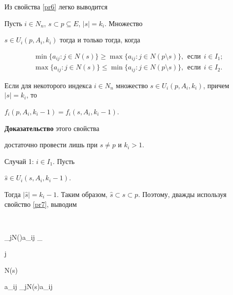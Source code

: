 Из свойства \ref{pr6} легко выводится





\begin{pty}\label{pr7}


Пусть $i\in N_n$, $s\subset p\subseteq E$, $|s|=k_i$. Множество


$s\in U_i(p, A_i, k_i)$ тогда и только тогда, когда


\begin{gather*}


\min\{a_{ij}: j\in N(s)\}\geq \max\{a_{ij}: j\in N(p\setminus


s)\},\ \ \text{если}\ \ i\in I_1;\\


%


\max\{a_{ij}: j\in N(s)\}\leq \min\{a_{ij}: j\in N(p\setminus


s)\},\ \ \text{если}\ \ i\in I_2.


\end{gather*}


\end{pty}





\begin{pty}\label{pr8}


Если для некоторого индекса $i\in N_n$ множество $s\in U_i(p,


A_i, k_i)$, причем $|s|=k_i$, то


$f_i(p, A_i, k_i-1)=f_i(s, A_i, k_i-1)$.


\end{pty}





{\bf Доказательство} этого свойства


достаточно провести лишь при $s\neq p$ и $k_i>1$.





Случай 1: $i\in I_1$. Пусть


$\widehat{s}\in U_i(s, A_i, k_i-1)$.


Тогда $|\widehat{s}|=k_i-1$. Таким образом, $\widehat{s}\subset


s\subset p$. Поэтому, дважды используя свойство \ref{pr7}, выводим


$$


\min_{j\in N()}a_{ij} \geq \max_{j\in


N(s\setminus{})}a_{ij} \geq \min_{j\in N(s)}a_{ij} \geq


